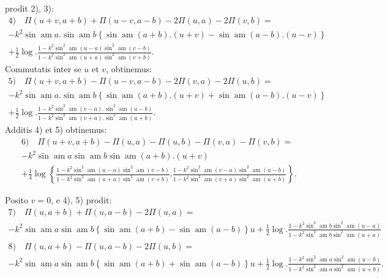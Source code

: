 \documentclass{article}
\begin{document}
prodit 2), 3):
\[
\begin{gathered}
\text{4)}\quad \Pi(u+v,a+b)+\Pi(u-v,a-b)-2\Pi(u,a)-2\Pi(v,b)=\\[1.5ex]
-k^{2}\sin\operatorname{am}a.\sin\operatorname{am}b\left\{\sin\operatorname{am}(a+b).(u+v)-\sin\operatorname{am}(a-b).(u-v)\right\}\\[1.5ex]
+\frac{1}{2}\log.\frac{1-k^{2}\sin^{2}\operatorname{am}(u-a)\sin^{2}\operatorname{am}(v-b)}{1-k^{2}\sin^{2}\operatorname{am}(u+a)\sin^{2}\operatorname{am}(v+b)}.
\end{gathered}
\]
Commutatis inter se $u$ et $v$, obtinemus:
\[
\begin{gathered}
\text{5)}\quad \Pi(u+v,a+b)-\Pi(u-v,a-b)-2\Pi(v,a)-2\Pi(u,b)=\\[1.5ex]
-k^{2}\sin\operatorname{am}a.\sin\operatorname{am}b\left\{\sin\operatorname{am}(a+b).(u+v)+\sin\operatorname{am}(a-b).(u-v)\right\}\\[1.5ex]
+\frac{1}{2}\log.\frac{1-k^{2}\sin^{2}\operatorname{am}(v-a).\sin^{2}\operatorname{am}(u-b)}{1-k^{2}\sin^{2}\operatorname{am}(v+a).\sin^{2}\operatorname{am}(u+b)}.
\end{gathered}
\]
Additis 4) et 5) obtinemus:
\[
\begin{gathered}
\text{6)}\quad \Pi(u+v,a+b)-\Pi(u,a)-\Pi(u,b)-\Pi(v,a)-\Pi(v,b)=\\[1.5ex]
-k^{2}\sin\operatorname{am}a\sin\operatorname{am}b\sin\operatorname{am}(a+b).(u+v)\\[1.5ex]
+\frac{1}{4}\log\left\{\frac{1-k^{2}\sin^{2}\operatorname{am}(u-a)\sin^{2}\operatorname{am}(v-b)}{1-k^{2}\sin^{2}\operatorname{am}(u+a)\sin^{2}\operatorname{am}(v+b)}.\frac{1-k^{2}\sin^{2}\operatorname{am}(v-a)\sin^{2}\operatorname{am}(u-b)}{1-k^{2}\sin^{2}\operatorname{am}(v+a)\sin^{2}\operatorname{am}(u+b)}\right\}.
\end{gathered}
\]

Posito $v=0$, e 4), 5) prodit:
\[
\begin{gathered}
\text{7)}\quad \Pi(u,a+b)+\Pi(u,a-b)-2\Pi(u,a)=\\[1.5ex]
-k^{2}\sin\operatorname{am}a\sin\operatorname{am}b\left\{\sin\operatorname{am}(a+b)-\sin\operatorname{am}(a-b)\right\}u+\frac{1}{2}\log.\frac{1-k^{2}\sin^{2}\operatorname{am}b\sin^{2}\operatorname{am}(u-a)}{1-k^{2}\sin^{2}\operatorname{am}b\sin^{2}\operatorname{am}(u+a)}\\[1.5ex]
\text{8)}\quad \Pi(u,a+b)-\Pi(u,a-b)-2\Pi(u,b)=\\[1.5ex]
-k^{2}\sin\operatorname{am}a\sin\operatorname{am}b\left\{\sin\operatorname{am}(a+b)+\sin\operatorname{am}(a-b)\right\}u+\frac{1}{2}\log.\frac{1-k^{2}\sin^{2}\operatorname{am}a\sin^{2}\operatorname{am}(u-b)}{1-k^{2}\sin^{2}\operatorname{am}a\sin^{2}\operatorname{am}(u+b)}.
\end{gathered}
\]
\end{document}
